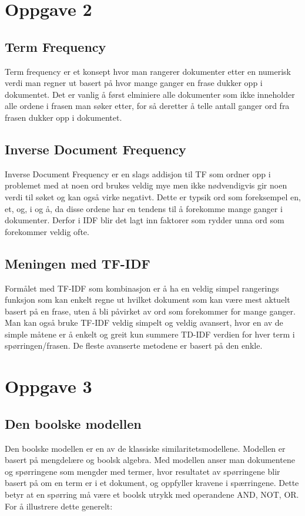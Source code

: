 \documentclass[]{article}
\begin{document}
\section{Oppgave 2}
\subsection{Term Frequency}
Term frequency er et konsept hvor man rangerer dokumenter etter en numerisk verdi man regner ut basert på hvor mange ganger en frase dukker opp i dokumentet. Det er vanlig å først elminiere alle dokumenter som ikke inneholder alle ordene i frasen man søker etter, for så deretter å telle antall ganger ord fra frasen dukker opp i dokumentet.

\subsection{Inverse Document Frequency}
Inverse Document Frequency er en slags addisjon til TF som ordner opp i problemet med at noen ord brukes veldig mye men ikke nødvendigvis gir noen verdi til søket og kan også virke negativt. Dette er typsik ord som foreksempel en, et, og, i og å, da disse ordene har en tendens til å forekomme mange ganger i dokumenter. Derfor i IDF blir det lagt inn faktorer som rydder unna ord som forekommer veldig ofte.

\subsection{Meningen med TF-IDF}
Formålet med TF-IDF som kombinasjon er å ha en veldig simpel rangerings funksjon som kan enkelt regne ut hvilket dokument som kan være mest aktuelt basert på en frase, uten å bli påvirket av ord som forekommer for mange ganger. 
Man kan også bruke TF-IDF veldig simpelt og veldig avansert, hvor en av de simple måtene er å enkelt og greit kun summere TD-IDF verdien for hver term i spørringen/frasen. De fleste avanserte metodene er basert på den enkle.
\pagebreak

\section{Oppgave 3}
\subsection{Den boolske modellen}
Den boolske modellen er en av de klassiske similaritetsmodellene. Modellen er basert på mengdelære og boolsk algebra.  Med modellen anser man dokumentene og spørringene som mengder med termer, hvor resultatet av spørringene blir basert på om en term er i et dokument, og oppfyller kravene i spærringene.  Dette betyr at en spørring må være et boolsk utrykk med operandene AND, NOT, OR.  For å illustrere dette generelt: 
\end{document}
